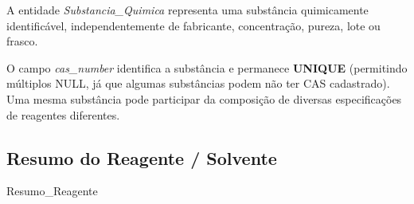 \begin{explicacao}
A entidade \textit{Substancia\_Quimica} representa uma substância quimicamente identificável, independentemente de fabricante, concentração, pureza, lote ou frasco.

O campo \textit{cas\_number} identifica a substância e permanece \textbf{UNIQUE} (permitindo múltiplos NULL, já que algumas substâncias podem não ter CAS cadastrado). Uma mesma substância pode participar da composição de diversas especificações de reagentes diferentes.
\end{explicacao}
\newpage
\subsection{Resumo do Reagente / Solvente}
\begin{entidade}{Resumo\_Reagente}
\end{entidade}
\newpage
